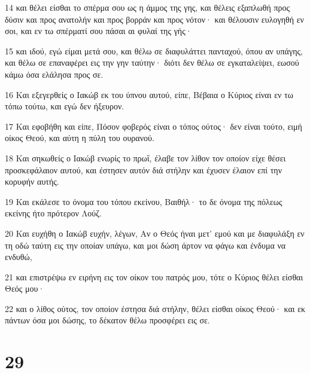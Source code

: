\par 14 και θέλει είσθαι το σπέρμα σου ως η άμμος της γης, και θέλεις εξαπλωθή προς δύσιν και προς ανατολήν και προς βορράν και προς νότον· και θέλουσιν ευλογηθή εν σοι, και εν τω σπέρματί σου πάσαι αι φυλαί της γής·
\par 15 και ιδού, εγώ είμαι μετά σου, και θέλω σε διαφυλάττει πανταχού, όπου αν υπάγης, και θέλω σε επαναφέρει εις την γην ταύτην· διότι δεν θέλω σε εγκαταλείψει, εωσού κάμω όσα ελάλησα προς σε.
\par 16 Και εξεγερθείς ο Ιακώβ εκ του ύπνου αυτού, είπε, Βέβαια ο Κύριος είναι εν τω τόπω τούτω, και εγώ δεν ήξευρον.
\par 17 Και εφοβήθη και είπε, Πόσον φοβερός είναι ο τόπος ούτος· δεν είναι τούτο, ειμή οίκος Θεού, και αύτη η πύλη του ουρανού.
\par 18 Και σηκωθείς ο Ιακώβ ενωρίς το πρωΐ, έλαβε τον λίθον τον οποίον είχε θέσει προσκεφάλαιον αυτού, και έστησεν αυτόν διά στήλην και έχυσεν έλαιον επί την κορυφήν αυτής.
\par 19 Και εκάλεσε το όνομα του τόπου εκείνου, Βαιθήλ· το δε όνομα της πόλεως εκείνης ήτο πρότερον Λούζ.
\par 20 Και ευχήθη ο Ιακώβ ευχήν, λέγων, Αν ο Θεός ήναι μετ' εμού και με διαφυλάξη εν τη οδώ ταύτη εις την οποίαν υπάγω, και μοι δώση άρτον να φάγω και ένδυμα να ενδυθώ,
\par 21 και επιστρέψω εν ειρήνη εις τον οίκον του πατρός μου, τότε ο Κύριος θέλει είσθαι Θεός μου·
\par 22 και ο λίθος ούτος, τον οποίον έστησα διά στήλην, θέλει είσθαι οίκος Θεού· και εκ πάντων όσα μοι δώσης, το δέκατον θέλω προσφέρει εις σε.

\chapter{29}

